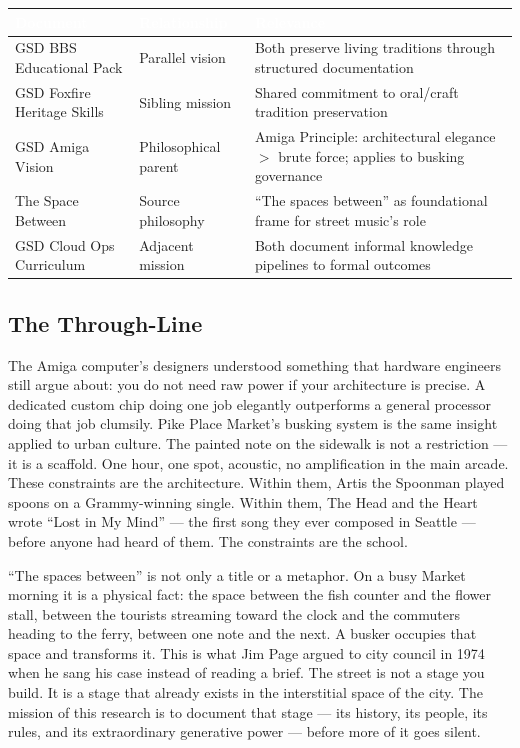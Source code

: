 \documentclass[11pt,letterpaper]{article}
\newcommand{\tableheader}[1]{\textbf{\sffamily\textcolor{white}{#1}}}
\begin{document}
\begin{center}
\begin{tabularx}{\textwidth}{L{3.5cm}L{3.5cm}X}
\toprule
{}
\tableheader{Document} & \tableheader{Relationship} & \tableheader{Relevance} \\
\midrule
GSD BBS Educational Pack & Parallel vision & Both preserve living traditions through structured documentation \\
GSD Foxfire Heritage Skills & Sibling mission & Shared commitment to oral/craft tradition preservation \\
GSD Amiga Vision & Philosophical parent & Amiga Principle: architectural elegance $>$ brute force; applies to busking governance \\
The Space Between & Source philosophy & ``The spaces between'' as foundational frame for street music's role \\
GSD Cloud Ops Curriculum & Adjacent mission & Both document informal knowledge pipelines to formal outcomes \\
\bottomrule
\end{tabularx}
\end{center}

\subsection{The Through-Line}

The Amiga computer's designers understood something that hardware engineers still argue about: you do not need raw power if your architecture is precise. A dedicated custom chip doing one job elegantly outperforms a general processor doing that job clumsily. Pike Place Market's busking system is the same insight applied to urban culture. The painted note on the sidewalk is not a restriction --- it is a scaffold. One hour, one spot, acoustic, no amplification in the main arcade. These constraints are the architecture. Within them, Artis the Spoonman played spoons on a Grammy-winning single. Within them, The Head and the Heart wrote ``Lost in My Mind'' --- the first song they ever composed in Seattle --- before anyone had heard of them. The constraints are the school.

``The spaces between'' is not only a title or a metaphor. On a busy Market morning it is a physical fact: the space between the fish counter and the flower stall, between the tourists streaming toward the clock and the commuters heading to the ferry, between one note and the next. A busker occupies that space and transforms it. This is what Jim Page argued to city council in 1974 when he sang his case instead of reading a brief. The street is not a stage you build. It is a stage that already exists in the interstitial space of the city. The mission of this research is to document that stage --- its history, its people, its rules, and its extraordinary generative power --- before more of it goes silent.
\end{document}
